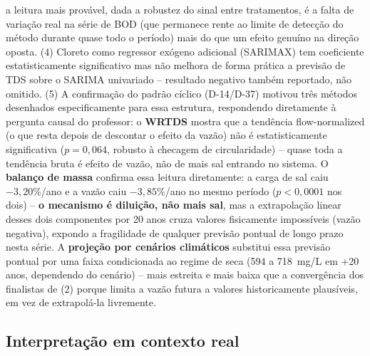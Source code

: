 a leitura mais provável, dada a robustez do sinal entre tratamentos, é a falta de variação real na série de BOD (que permanece rente ao limite de detecção do método durante quase todo o período) mais do que um efeito genuíno na direção oposta. (4) Cloreto como regressor exógeno adicional (SARIMAX) tem coeficiente estatisticamente significativo mas não melhora de forma prática a previsão de TDS sobre o SARIMA univariado -- resultado negativo também reportado, não omitido. (5) A confirmação do padrão cíclico (D-14/D-37) motivou três métodos desenhados especificamente para essa estrutura, respondendo diretamente à pergunta causal do professor: o \textbf{WRTDS} mostra que a tendência flow-normalized (o que resta depois de descontar o efeito da vazão) não é estatisticamente significativa ($p=0{,}064$, robusto à checagem de circularidade) -- quase toda a tendência bruta é efeito de vazão, não de mais sal entrando no sistema. O \textbf{balanço de massa} confirma essa leitura diretamente: a carga de sal caiu $-3{,}20\%$/ano e a vazão caiu $-3{,}85\%$/ano no mesmo período ($p<0{,}0001$ nos dois) -- \textbf{o mecanismo é diluição, não mais sal}, mas a extrapolação linear desses dois componentes por 20 anos cruza valores fisicamente impossíveis (vazão negativa), expondo a fragilidade de qualquer previsão pontual de longo prazo nesta série. A \textbf{projeção por cenários climáticos} substitui essa previsão pontual por uma faixa condicionada ao regime de seca (594 a 718~mg/L em +20 anos, dependendo do cenário) -- mais estreita e mais baixa que a convergência dos finalistas de (2) porque limita a vazão futura a valores historicamente plausíveis, em vez de extrapolá-la livremente.

\subsection{Interpretação em contexto real}

